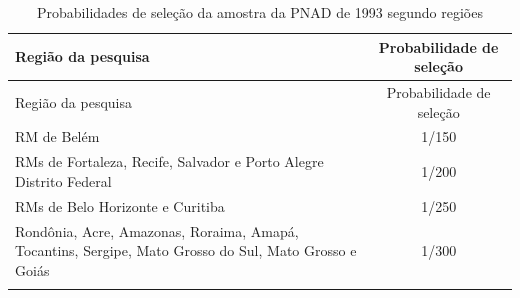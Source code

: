 \documentclass[]{book}
\theoremstyle{definition}
\theoremstyle{definition}
\theoremstyle{definition}
\theoremstyle{remark}
\begin{document}
\begin{longtable}[]{@{}lc@{}}
\caption{\label{tab:proselpnad} Probabilidades de seleção da amostra da PNAD
de 1993 segundo regiões}\tabularnewline
\toprule
\begin{minipage}[b]{0.75\columnwidth}\raggedright\strut
Região da pesquisa\strut
\end{minipage} & \begin{minipage}[b]{0.19\columnwidth}\centering\strut
Probabilidade de seleção\strut
\end{minipage}\tabularnewline
\midrule
\endfirsthead
\toprule
\begin{minipage}[b]{0.75\columnwidth}\raggedright\strut
Região da pesquisa\strut
\end{minipage} & \begin{minipage}[b]{0.19\columnwidth}\centering\strut
Probabilidade de seleção\strut
\end{minipage}\tabularnewline
\midrule
\endhead
\begin{minipage}[t]{0.75\columnwidth}\raggedright\strut
RM de Belém\strut
\end{minipage} & \begin{minipage}[t]{0.19\columnwidth}\centering\strut
1/150\strut
\end{minipage}\tabularnewline
\begin{minipage}[t]{0.75\columnwidth}\raggedright\strut
RMs de Fortaleza, Recife, Salvador e Porto Alegre Distrito Federal\strut
\end{minipage} & \begin{minipage}[t]{0.19\columnwidth}\centering\strut
1/200\strut
\end{minipage}\tabularnewline
\begin{minipage}[t]{0.75\columnwidth}\raggedright\strut
RMs de Belo Horizonte e Curitiba\strut
\end{minipage} & \begin{minipage}[t]{0.19\columnwidth}\centering\strut
1/250\strut
\end{minipage}\tabularnewline
\begin{minipage}[t]{0.75\columnwidth}\raggedright\strut
Rondônia, Acre, Amazonas, Roraima, Amapá, Tocantins, Sergipe, Mato
Grosso do Sul, Mato Grosso e Goiás\strut
\end{minipage} & \begin{minipage}[t]{0.19\columnwidth}\centering\strut
1/300\strut
\end{minipage}\tabularnewline
\begin{minipage}[t]{0.75\columnwidth}\raggedright\strut

\end{minipage}
\end{longtable}
\end{document}
